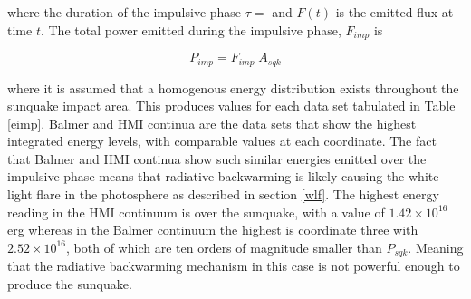 where the duration of the impulsive phase $\tau = $ and $F(t)$ is the emitted flux at time $t$. The total power emitted during the impulsive phase, $F_{imp}$ is

\begin{equation}
P_{imp}=F_{imp} \; A_{sqk}
\end{equation}\label{e-imp}

where it is assumed that a homogenous energy distribution exists throughout the sunquake impact area. This produces values for each data set tabulated in Table \ref{eimp}. Balmer and HMI continua are the data sets that show the highest integrated energy levels, with comparable values at each coordinate. The fact that Balmer and HMI continua show such similar energies emitted over the impulsive phase means that radiative backwarming is likely causing the white light flare in the photosphere as described in section \ref{wlf}. The highest energy reading in the HMI continuum is over the sunquake, with a value of $1.42{\times}10^{16}$ erg whereas in the Balmer continuum the highest is coordinate three with $2.52{\times}10^{16}$, both of which are ten orders of magnitude smaller than $P_{sqk}$. Meaning that the radiative backwarming mechanism in this case is not powerful enough to produce the sunquake.    


